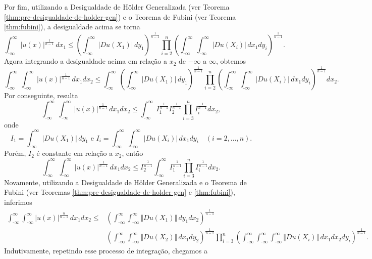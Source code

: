 \documentclass[a4paper, 11pt]{book}
\theoremstyle{definition}
\newcommand{\m}{\text{-}}
\begin{document}
\begin{prf}
\[    \]
    Por fim, utilizando a Desigualdade de Hölder Generalizada (ver Teorema \ref{thm:pre-desigualdade-de-holder-gen}) e o Teorema de Fubini (ver Teorema \ref{thm:fubini}), a desigualdade acima se torna
    \[
        \int_{\m\infty}^{\infty} |u(x)|^{\frac{1}{n-1}} \,dx_1 \leqslant \left( \int_{\m\infty}^{\infty} |Du(X_1)| \,dy_1 \right)^{\frac{1}{n-1}}\prod_{i=2}^n \left(\int_{\m\infty}^{\infty}   \int_{\m\infty}^{\infty} |Du(X_i)| \, dx_1dy_i\right)^{\frac{1}{n-1}}.
    \]
    Agora integrando a desigualdade acima em relação a $x_2$ de $-\infty$ a $\infty$, obtemos
    \[
        \int_{\m\infty}^{\infty}\int_{\m\infty}^{\infty} |u(x)|^{\frac{1}{n-1}} \,dx_1dx_2 \leqslant \int_{\m\infty}^{\infty}\!\!\left( \int_{\m\infty}^{\infty} |Du(X_1)| \,dy_1 \right)^{\frac{1}{n-1}}\prod_{i=2}^n \left(\int_{\m\infty}^{\infty} \!\int_{\m\infty}^{\infty} |Du(X_i)| \, dx_1dy_i\right)^{\frac{1}{n-1}} dx_2.
    \]
    Por conseguinte, resulta
    \[
        \int_{\m\infty}^{\infty}\int_{\m\infty}^{\infty} |u(x)|^{\frac{1}{n-1}} \,dx_1dx_2 \leqslant \int_{\m\infty}^{\infty} I_1^{\frac{1}{n-1}}I_2^{\frac{1}{n-1}}\prod_{i=3}^n I_i^{\frac{1}{n-1}} dx_2,
    \]
    onde
    \[
        I_1 = \int_{\m\infty}^{\infty} |Du(X_1)| \,dy_1 \text{ e } I_i = \int_{\m\infty}^{\infty} \!\int_{\m\infty}^{\infty} |Du(X_i)| \, dx_1dy_i \quad(i = 2,\dots,n).
    \]
    Porém, $I_2$ é constante em relação a $x_2$, então
    \[
        \int_{\m\infty}^{\infty}\int_{\m\infty}^{\infty} |u(x)|^{\frac{1}{n-1}} \,dx_1dx_2 \leqslant I_2^{\frac{1}{n-1}}\int_{\m\infty}^{\infty} I_1^{\frac{1}{n-1}}\prod_{i=3}^n I_i^{\frac{1}{n-1}} dx_2.
    \]
    Novamente, utilizando a Desigualdade de Hölder Generalizada e o Teorema de Fubini (ver Teoremas \ref{thm:pre-desigualdade-de-holder-gen} e \ref{thm:fubini}), inferimos
    {\small
    \[
        \begin{aligned}
            \int_{\m\infty}^{\infty}\int_{\m\infty}^{\infty} |u(x)|^{\frac{n}{n-1}} \,dx_1dx_2 \leqslant &\left( \int_{\m\infty}^{\infty} \int_{\m\infty}^{\infty} \Vert Du(X_1) \Vert \,dy_1 dx_2 \right)^{\frac{1}{n-1}}\\ &\left( \int_{\m\infty}^{\infty} \int_{\m\infty}^{\infty} \Vert Du(X_2) \Vert \,dx_1 dy_2 \right)^{\frac{1}{n-1}} \prod_{i=3}^n \left( \int_{\m\infty}^{\infty}\int_{\m\infty}^{\infty}\int_{\m\infty}^{\infty} \Vert Du(X_i) \Vert \,dx_1dx_2dy_i \right)^{\frac{1}{n-1}} \!\!.
        \end{aligned}
    \]\!}
    Indutivamente, repetindo esse processo de integração, chegamos a
    \[
        \begin{aligned}

\end{aligned}\]
\end{prf}
\end{document}
